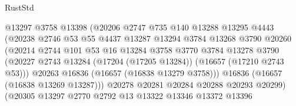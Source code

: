 \begin{lexlean}{RustStd}
\begin{coremodule}
                                  @13297
                                  @3758
                                  @13398
                                  (@20206
                                    @2747
                                    @735
                                    @140
                                    @13288
                                    @13295
                                    @4443
                                    (@20238
                                      @2746
                                      @53
                                      @55
                                      @4437
                                      @13287
                                      @13294
                                      @3784
                                      @13268
                                      @3790
                                      @20260
                                      (@20214
                                        @2744
                                        @101
                                        @53
                                        @16
                                        @13284
                                        @3758
                                        @3770
                                        @3784
                                        @13278
                                        @3790
                                        (@20227
                                          @2743
                                          @13284
                                          (@17204 (@17205 @13284))
                                          (@16657 (@17210 @2743 @53)))
                                        @20263
                                        @16836
                                        (@16657 (@16838 @13279 @3758)))
                                      @16836
                                      (@16657 (@16838 @13269 @13287)))
                                    @20278
                                    @20281
                                    @20284
                                    @20288
                                    @20293
                                    @20299)
                                  (@20305
                                    @13297
                                    @2770
                                    @2792
                                    @13
                                    @13322
                                    @13346
                                    @13372
                                    @13396

\end{coremodule}
\end{lexlean}
